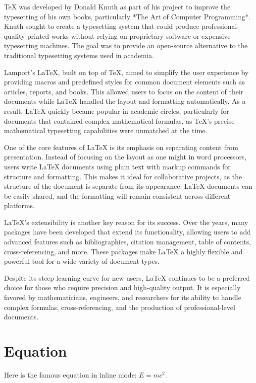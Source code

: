 TeX was developed by Donald Knuth as part of his project to improve the typesetting of his own books, particularly *The Art of Computer Programming*. Knuth sought to create a typesetting system that could produce professional-quality printed works without relying on proprietary software or expensive typesetting machines. The goal was to provide an open-source alternative to the traditional typesetting systems used in academia.

Lamport's LaTeX, built on top of TeX, aimed to simplify the user experience by providing macros and predefined styles for common document elements such as articles, reports, and books. This allowed users to focus on the content of their documents while LaTeX handled the layout and formatting automatically. As a result, LaTeX quickly became popular in academic circles, particularly for documents that contained complex mathematical formulas, as TeX’s precise mathematical typesetting capabilities were unmatched at the time.

One of the core features of LaTeX is its emphasis on separating content from presentation. Instead of focusing on the layout as one might in word processors, users write LaTeX documents using plain text with markup commands for structure and formatting. This makes it ideal for collaborative projects, as the structure of the document is separate from its appearance. LaTeX documents can be easily shared, and the formatting will remain consistent across different platforms.

LaTeX’s extensibility is another key reason for its success. Over the years, many packages have been developed that extend its functionality, allowing users to add advanced features such as bibliographies, citation management, table of contents, cross-referencing, and more. These packages make LaTeX a highly flexible and powerful tool for a wide variety of document types.

Despite its steep learning curve for new users, LaTeX continues to be a preferred choice for those who require precision and high-quality output. It is especially favored by mathematicians, engineers, and researchers for its ability to handle complex formulas, cross-referencing, and the production of professional-level documents.

\section{Equation}

Here is the famous equation in inline mode: $E = mc^2$.

